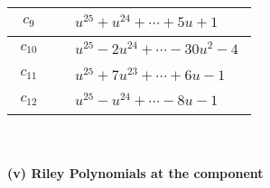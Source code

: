 \documentclass[1p]{elsarticle_modified}
\theoremstyle{definition}
\begin{document}
\begin{tabular}{m{50pt}|m{274pt}}
\hline $$\begin{aligned}c_{9}\end{aligned}$$&$\begin{aligned}
&u^{25}+u^{24}+\cdots+5 u+1
\end{aligned}$\\
\hline $$\begin{aligned}c_{10}\end{aligned}$$&$\begin{aligned}
&u^{25}-2 u^{24}+\cdots-30 u^2-4
\end{aligned}$\\
\hline $$\begin{aligned}c_{11}\end{aligned}$$&$\begin{aligned}
&u^{25}+7 u^{23}+\cdots+6 u-1
\end{aligned}$\\
\hline $$\begin{aligned}c_{12}\end{aligned}$$&$\begin{aligned}
&u^{25}- u^{24}+\cdots-8 u-1
\end{aligned}$\\
\hline
\end{tabular}\\~\\
\newpage\renewcommand{\arraystretch}{1}
\flushleft \textbf{(v) Riley Polynomials at the component}\newline \\
\end{document}
